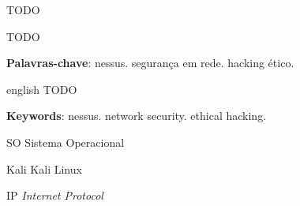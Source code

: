 \documentclass[
	12pt,				%
	openright,			%
	twoside,			%
	a4paper,			%
	english,			%
	french,				%
	spanish,			%
	brazil				%
	]{abntex2}
\begin{document}
\begin{agradecimentos}
TODO

\end{agradecimentos}



\setlength{\absparsep}{18pt} %
\begin{resumo}
 TODO

 \textbf{Palavras-chave}: nessus. segurança em rede. hacking ético.
\end{resumo}

\begin{resumo}[Abstract]
 \begin{otherlanguage*}{english}
   TODO

   \vspace{\onelineskip}
 
   \noindent 
   \textbf{Keywords}: nessus. network security. ethical hacking.
 \end{otherlanguage*}
\end{resumo}

\listoffigures*
\cleardoublepage

\listoftables*
\cleardoublepage

\begin{siglas}
  \item[SO] Sistema Operacional
  \item[Kali] Kali Linux
  \item[IP] \textit{Internet Protocol}
\end{siglas}
\end{document}
